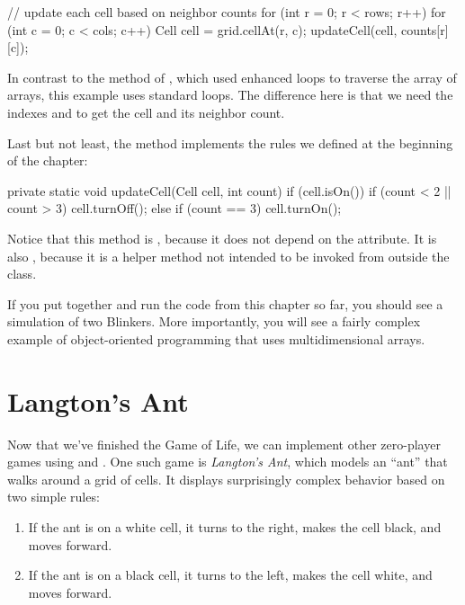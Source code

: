 \begin{code}
// update each cell based on neighbor counts
for (int r = 0; r < rows; r++) {
    for (int c = 0; c < cols; c++) {
        Cell cell = grid.cellAt(r, c);
        updateCell(cell, counts[r][c]);
    }
}
\end{code}

In contrast to the  method of , which used enhanced  loops to traverse the array of arrays, this example uses standard  loops.
The difference here is that we need the indexes  and  to get the cell and its neighbor count.

Last but not least, the  method implements the rules we defined at the beginning of the chapter:

\begin{code}
private static void updateCell(Cell cell, int count) {
    if (cell.isOn()) {
        if (count < 2 || count > 3) {
            cell.turnOff();
        }
    } else {
        if (count == 3) {
            cell.turnOn();
        }
    }
}
\end{code}

Notice that this method is , because it does not depend on the  attribute.
It is also , because it is a helper method not intended to be invoked from outside the class.

If you put together and run the code from this chapter so far, you should see a simulation of two Blinkers.
More importantly, you will see a fairly complex example of object-oriented programming that uses multidimensional arrays.


\section{Langton's Ant}

Now that we've finished the Game of Life, we can implement other zero-player games using  and .
One such game is {\it Langton's Ant}, which models an ``ant'' that walks around a grid of cells.
It displays surprisingly complex behavior based on two simple rules:

\begin{enumerate}
\item If the ant is on a white cell, it turns to the right, makes the cell black, and moves forward.
\item If the ant is on a black cell, it turns to the left, makes the cell white, and moves forward.
\end{enumerate}

